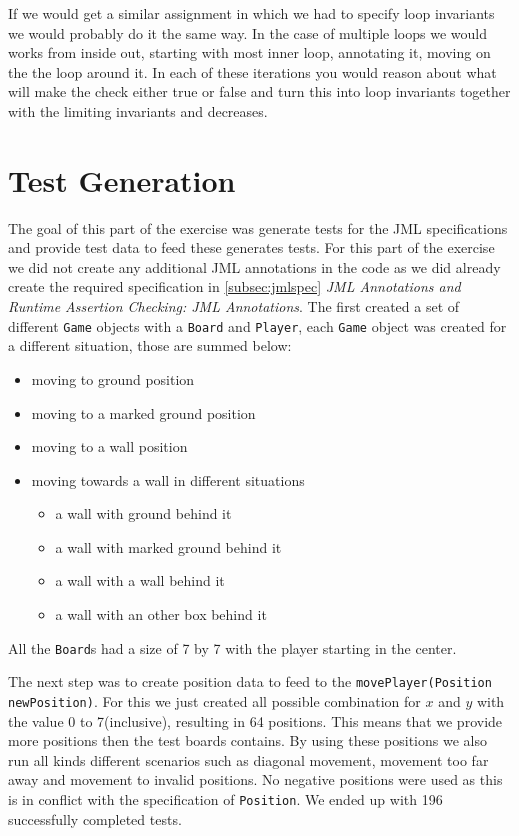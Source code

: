\documentclass[a4paper]{article}
\begin{document}
	If we would get a similar assignment in which we had to specify loop invariants we would probably do it the same way. In the case of multiple loops we would works from inside out, starting with most inner loop, annotating it, moving on the the loop around it. In each of these iterations you would reason about what will make the check either true or false and turn this into loop invariants together with the limiting invariants and decreases.
	
	\section{Test Generation}
	The goal of this part of the exercise was generate tests for the JML specifications and provide test data to feed these generates tests.
	For this part of the exercise we did not create any additional JML annotations in the code as we did already create the required specification in \ref{subsec:jmlspec} \textit{JML Annotations and Runtime Assertion Checking: JML Annotations}.
	The first created a set of different \texttt{Game} objects with a \texttt{Board} and \texttt{Player}, each \texttt{Game} object was created for a different situation, those are summed below:
	\begin{itemize}
		\item moving to ground position
		\item moving to a marked ground position
		\item moving to a wall position
		\item moving towards a wall in different situations
		\begin{itemize}
			\item a wall with ground behind it
			\item a wall with marked ground behind it
			\item a wall with a wall behind it
			\item a wall with an other box behind it
		\end{itemize}
	\end{itemize}
	All the \texttt{Board}s had a size of 7 by 7 with the player starting in the center.
	
	The next step was to create position data to feed to the \texttt{movePlayer(Position newPosition)}. For this we just created all possible combination for $x$ and $y$ with the value 0 to 7(inclusive), resulting in 64 positions. This means that we provide more positions then the test boards contains. By using these positions we also run all kinds different scenarios such as diagonal movement, movement too far away and movement to invalid positions. No negative positions were used as this is in conflict with the specification of \texttt{Position}. We ended up with 196 successfully completed tests.
	
\end{document}
